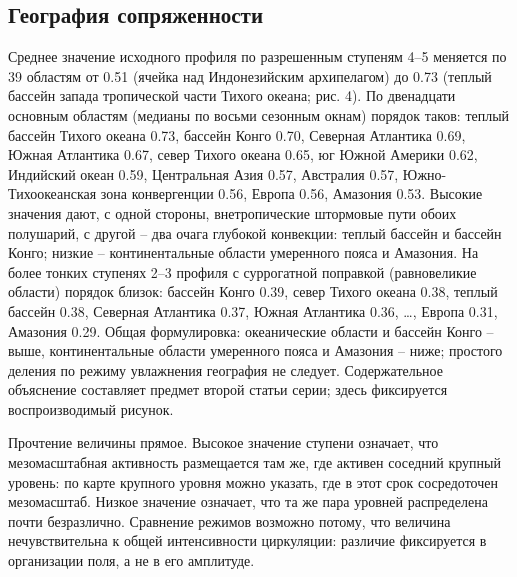 \documentclass[12pt,a4paper]{article}
\begin{document}
\subsection{География сопряженности}

Среднее значение исходного профиля по разрешенным ступеням 4--5 меняется по 39 областям от 0.51 (ячейка над Индонезийским архипелагом) до 0.73 (теплый бассейн запада тропической части Тихого океана; рис. 4). По двенадцати основным областям (медианы по восьми сезонным окнам) порядок таков: теплый бассейн Тихого океана 0.73, бассейн Конго 0.70, Северная Атлантика 0.69, Южная Атлантика 0.67, север Тихого океана 0.65, юг Южной Америки 0.62, Индийский океан 0.59, Центральная Азия 0.57, Австралия 0.57, Южно-Тихоокеанская зона конвергенции 0.56, Европа 0.56, Амазония 0.53. Высокие значения дают, с одной стороны, внетропические штормовые пути обоих полушарий, с другой -- два очага глубокой конвекции: теплый бассейн и бассейн Конго; низкие -- континентальные области умеренного пояса и Амазония. На более тонких ступенях 2--3 профиля с суррогатной поправкой (равновеликие области) порядок близок: бассейн Конго 0.39, север Тихого океана 0.38, теплый бассейн 0.38, Северная Атлантика 0.37, Южная Атлантика 0.36, \dots, Европа 0.31, Амазония 0.29. Общая формулировка: океанические области и бассейн Конго -- выше, континентальные области умеренного пояса и Амазония -- ниже; простого деления по режиму увлажнения география не следует. Содержательное объяснение составляет предмет второй статьи серии; здесь фиксируется воспроизводимый рисунок.

Прочтение величины прямое. Высокое значение ступени означает, что мезомасштабная активность размещается там же, где активен соседний крупный уровень: по карте крупного уровня можно указать, где в этот срок сосредоточен мезомасштаб. Низкое значение означает, что та же пара уровней распределена почти безразлично. Сравнение режимов возможно потому, что величина нечувствительна к общей интенсивности циркуляции: различие фиксируется в организации поля, а не в его амплитуде.
\end{document}
